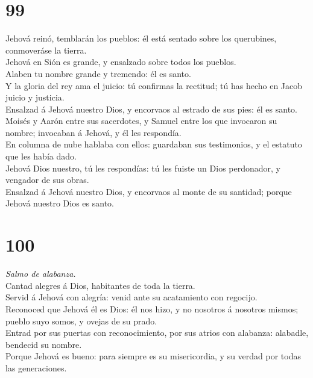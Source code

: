 \hypertarget{section-98}{%
\section{99}\label{section-98}}

 Jehová reinó, temblarán los pueblos: él está sentado sobre
los querubines, conmoveráse la tierra.\\
 Jehová en Sión es grande, y ensalzado sobre todos los
pueblos.\\
 Alaben tu nombre grande y tremendo: él es santo.\\
 Y la gloria del rey ama el juicio: tú confirmas la
rectitud; tú has hecho en Jacob juicio y justicia.\\
 Ensalzad á Jehová nuestro Dios, y encorvaos al estrado de
sus pies: él es santo.\\
 Moisés y Aarón entre sus sacerdotes, y Samuel entre los que
invocaron su nombre; invocaban á Jehová, y él les respondía.\\
 En columna de nube hablaba con ellos: guardaban sus
testimonios, y el estatuto que les había dado.\\
 Jehová Dios nuestro, tú les respondías: tú les fuiste un
Dios perdonador, y vengador de sus obras.\\
 Ensalzad á Jehová nuestro Dios, y encorvaos al monte de su
santidad; porque Jehová nuestro Dios es santo.

\hypertarget{section-99}{%
\section{100}\label{section-99}}

 \emph{Salmo de alabanza.}\\
Cantad alegres á Dios, habitantes de toda la tierra.\\
 Servid á Jehová con alegría: venid ante su acatamiento con
regocijo.\\
 Reconoced que Jehová él es Dios: él nos hizo, y no nosotros
á nosotros mismos; pueblo suyo somos, y ovejas de su prado.\\
 Entrad por sus puertas con reconocimiento, por sus atrios
con alabanza: alabadle, bendecid su nombre.\\
 Porque Jehová es bueno: para siempre es su misericordia, y
su verdad por todas las generaciones.

